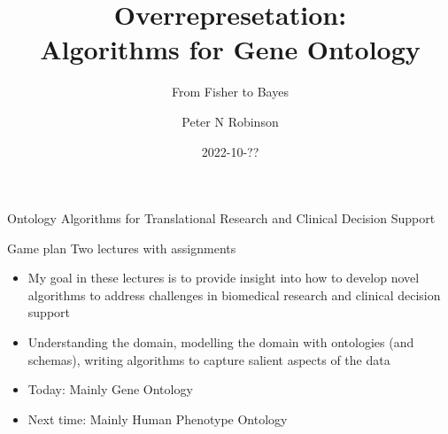 \documentclass{beamer}
\title{Overrepresetation: \\ Algorithms for Gene Ontology}
\subtitle{From Fisher to Bayes}
\author{Peter N Robinson}
\institute{The Jackson Laboratory \\ Farmington CT}
\date{2022-10-??}
\begin{document}

\begin{frame}
	\maketitle %
\end{frame}


\begin{frame}{Ontology Algorithms for Translational Research and Clinical Decision Support}
 \begin{mybluebox}{Game plan}
 Two lectures with assignments
 \end{mybluebox}
 
 \begin{itemize}
 \item My goal in these lectures is to provide insight into how to develop novel algorithms to address challenges in biomedical research and clinical decision support
 \item Understanding the domain, modelling the domain with ontologies (and schemas), writing algorithms to capture salient aspects of the data
 \item Today: Mainly Gene Ontology
 \item Next time: Mainly Human Phenotype Ontology
 \end{itemize}

\end{frame}





\end{document}
